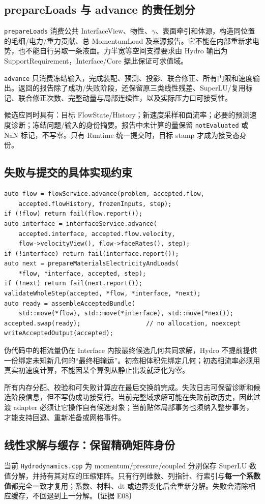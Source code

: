 \documentclass[UTF8,a4paper,11pt,fontset=fandol]{ctexart}
\newcommand{\code}[1]{\nolinkurl{#1}}
\newcommand{\ev}[1]{{\small\color{muted}〔证据 #1〕}}
\begin{document}
\subsection{prepareLoads 与 advance 的责任划分}
\code{prepareLoads} 消费公共 InterfaceView、物性、$\gamma$、表面牵引和体源，构造同位置的毛细/电力/重力贡献、总 MomentumLoad 及来源报告。它不能在内部重新求电势，也不能自行另取一条液面。力半宽等空间支撑要求由 Hydro 输出为 SupportRequirement，Interface/Core 据此保证可求值域。

\code{advance} 只消费冻结输入，完成装配、预测、投影、联合修正、所有门限和速度输出。返回的报告除了成功/失败阶段，还保留原三类线性残差、SuperLU/复用标记、联合修正次数、完整动量与局部连续性，以及实际压力口可接受性。

候选应同时具有：目标 FlowState/History；新速度采样和面流率；必要的预测速度诊断；冻结问题/输入的身份摘要。报告中未计算的量保留 \code{notEvaluated} 或 NaN 标记，不写零。只有 Runtime 统一提交时，目标 stamp 才成为接受态身份。

\subsection{失败与提交的具体实现约束}
\begin{lstlisting}
auto flow = flowService.advance(problem, accepted.flow,
    accepted.flowHistory, frozenInputs, step);
if (!flow) return fail(flow.report());
auto interface = interfaceService.advance(
    accepted.interface, accepted.flow.velocity,
    flow->velocityView(), flow->faceRates(), step);
if (!interface) return fail(interface.report());
auto next = prepareMaterialsElectricityAndLoads(
    *flow, *interface, accepted, step);
if (!next) return fail(next.report());
validateWholeStep(accepted, *flow, *interface, *next);
auto ready = assembleAcceptedBundle(
    std::move(*flow), std::move(*interface), std::move(*next));
accepted.swap(ready);                  // no allocation, noexcept
writeAcceptedOutput(accepted);
\end{lstlisting}
伪代码中的相流量仍在 Interface 内按最终候选几何共同求解，Hydro 不提前提供一份绑定未知新几何的“最终相输运”。初态相体积先绑定几何；初态相流率必须用真实初速度计算，不能因某个算例从静止出发就泛化为零。

所有内存分配、校验和可失败计算应在最后交换前完成。失败日志可保留诊断和候选阶段信息，但不写伪成功接受行。当前完整域求解可能在失败前改历史，因此过渡 adapter 必须让它操作自有候选对象；当前贴体局部事务也须纳入整步事务，才能支持回退、重新准备或网格事件。

\subsection{线性求解与缓存：保留精确矩阵身份}
当前 \code{Hydrodynamics.cpp} 为 momentum/pressure/coupled 分别保存 SuperLU 数值分解，并持有其对应的压缩矩阵。只有行列维数、列指针、行索引与\textbf{每一个系数值}都完全一致才复用；系数、材料、dt 或边界变化后会重新分解。失败会清除相应缓存，不回退到上一分解。\ev{E08}
\end{document}
